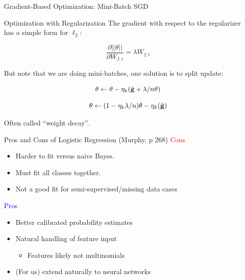 \documentclass{beamer}
\begin{document}
\begin{frame}{Gradient-Based Optimization: Mini-Batch SGD}
  \begin{figure}
    \begin{algorithmic}
      \EndFor{}
      \EndWhile{}
      \State{\Return{$\theta$}}
    \end{algorithmic}
  \end{figure}
\end{frame}


\begin{frame}{Optimization with Regularization}
  The gradient with respect to the regularizer has a simple form for $\ell_2$:

  \[ \frac{\partial ||\theta||}{\partial W_{f, i}} = \lambda  W_{f, i}\]

  But note that we are doing mini-batches, one solution is to split update:

  \[\theta \gets \theta - \eta_k (\hat{\mathbf{g}} + \lambda/n \theta) \]


  \[\theta \gets  (1 -\eta_k \lambda/n) \theta -  \eta_k (\hat{\mathbf{g}}) \]


  Often called ``weight decay''.

\end{frame}


\begin{frame}{Pros and Cons of Logistic Regression (Murphy, p 268)}
  \textcolor{red}{Cons}
  \begin{itemize}
  \item Harder to fit versus naive Bayes.
  \item Must fit all classes together.
  \item Not a good fit for semi-supervised/missing data cases

  \end{itemize}
  \textcolor{blue}{Pros}
  \begin{itemize}
  \item Better calibrated probability estimates
  \item Natural handling of feature input

    \begin{itemize}
    \item Features likely not multinomials
    \end{itemize}

  \item (For us) extend naturally to neural networks
  \end{itemize}
\end{frame}
\end{document}
